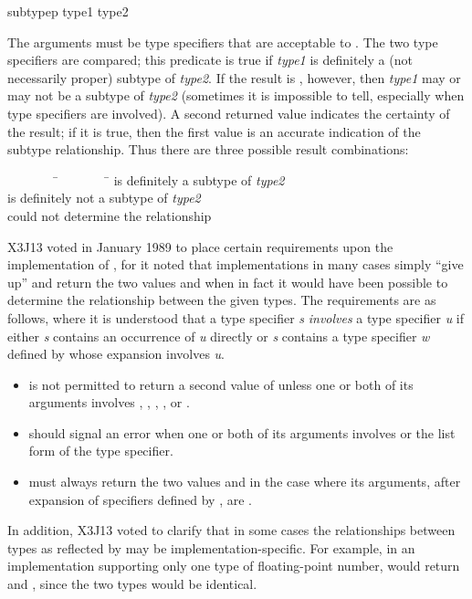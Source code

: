 \begin{defun}[Function]
subtypep type1 type2

The arguments must be type specifiers that are acceptable to .
The two type specifiers are compared; this predicate is true
if {\it type1} is definitely a (not necessarily proper) subtype of {\it type2}.
If the result is {\false}, however, then {\it type1} may or may not be a subtype of
{\it type2} (sometimes it is impossible to tell, especially when
 type specifiers are involved).
A second returned value indicates the certainty of the result;
if it is true, then the first value is an accurate indication
of the subtype relationship.  Thus there are three possible
result combinations:
\begin{tabbing}
~~~~~~~~\=~~~~~~~~\=\kill
{\true}\>{\true} is definitely a subtype of {\it type2} \\
{\false}\>{\true} is definitely not a subtype of {\it type2} \\
{\false}\>{\false}\> could not determine the relationship
\end{tabbing}

\begin{new}
X3J13 voted in January 1989
to place certain requirements upon the implementation of ,
for it noted that implementations in many cases simply ``give up''
and return the two values  and  when in fact it would have been
possible to determine the relationship between the given types.
The requirements are as follows, where it is understood that a type specifier {\it s}
{\it involves} a type specifier {\it u} if either {\it s} contains an occurrence of {\it u}
directly or {\it s} contains a type specifier {\it w} defined by  whose
expansion involves {\it u}.
\begin{itemize}
\item {} is not permitted to return a second value of 
unless one or both of its arguments involves ,
, , , or .
\item {} should signal an error when one or both of its arguments
involves  or the list form of the  type specifier.
\item {} must always return the two values  and 
in the case where its arguments, after expansion of specifiers
defined by , are .
\end{itemize}
In addition, X3J13 voted to clarify that in some cases
the relationships between types
as reflected by  may be implementation-specific.
For example, in an implementation supporting only one type of
floating-point number,  would return
 and , since the two types would be identical.


\end{new}
\end{defun}
